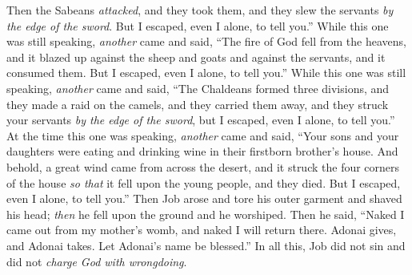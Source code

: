 \begin{biblechapter}
\verse Then the Sabeans \textit{attacked}, and they took them, and they slew the servants \textit{by the edge of the sword}. But I escaped, even I alone, to tell you.”
\verse While this one was still speaking, \textit{another} came and said, “The fire of God fell from the heavens, and it blazed up against the sheep and goats and against the servants, and it consumed them. But I escaped, even I alone, to tell you.”
\verse While this one was still speaking, \textit{another} came and said, “The Chaldeans formed three divisions, and they made a raid on the camels, and they carried them away, and they struck your servants \textit{by the edge of the sword}, but I escaped, even I alone, to tell you.”
\verse At the time this one was speaking, \textit{another} came and said, “Your sons and your daughters were eating and drinking wine in their firstborn brother’s house.
\verse And behold, a great wind came from across the desert, and it struck the four corners of the house \textit{so that} it fell upon the young people, and they died. But I escaped, even I alone, to tell you.”
\verse Then Job arose and tore his outer garment and shaved his head; \textit{then} he fell upon the ground and he worshiped.
\verse Then he said, “Naked I came out from my mother’s womb, and naked I will return there. Adonai gives, and Adonai takes. Let Adonai’s name be blessed.”
\verse In all this, Job did not sin and did not \textit{charge God with wrongdoing}.
\end{biblechapter}

